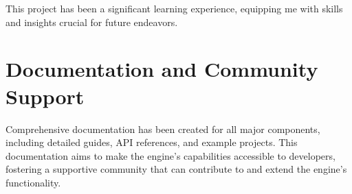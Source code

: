 This project has been a significant learning experience, equipping me with skills and insights crucial for future endeavors.

\section*{Documentation and Community Support}

Comprehensive documentation has been created for all major components, including detailed guides, API references, and example projects. This documentation aims to make the engine's capabilities accessible to developers, fostering a supportive community that can contribute to and extend the engine's functionality.

